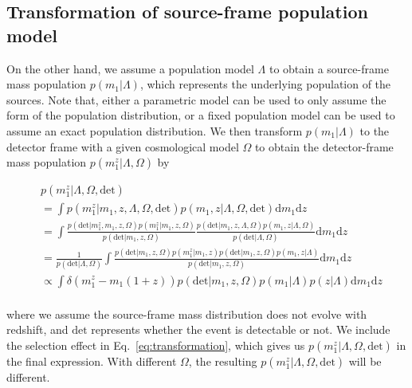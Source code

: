 \documentclass[aps,prd,twocolumn,superscriptaddress,preprintnumbers,nofootinbib,hidelinks]{revtex4-2}
\begin{document}
\subsection{Transformation of source-frame population model}
\label{sec:transformation}

On the other hand, we assume a population model $\Lambda$ to obtain a source-frame mass population $p(m_1|\Lambda)$, which represents the underlying population of the sources.
Note that, either a parametric model can be used to only assume the form of the population distribution, or a fixed population model can be used to assume an exact population distribution.
We then transform $p(m_1|\Lambda)$ to the detector frame with a given cosmological model $\Omega$ to obtain the detector-frame mass population $p(m^z_1|\Lambda, \Omega)$ by
\begin{widetext}
    \begin{equation}
        \label{eq:transformation}
        \begin{split}
            &p(m^z_1|\Lambda, \Omega, \mathrm{det}) \\
            &= \int p(m^z_1|m_1, z, \Lambda, \Omega, \mathrm{det}) p(m_1, z|\Lambda, \Omega, \mathrm{det}) \mathrm{d}m_1 \mathrm{d}z \\
            &= \int \frac{p(\mathrm{det}|m^z_1, m_1, z, \Omega)p(m^z_1|m_1, z, \Omega)}{p(\mathrm{det}|m_1, z, \Omega)} \frac{p(\mathrm{det}|m_1, z, \Lambda, \Omega)p(m_1, z|\Lambda, \Omega)}{p(\mathrm{det}|\Lambda, \Omega)} \mathrm{d}m_1 \mathrm{d}z \\
            &= \frac{1}{p(\mathrm{det}|\Lambda, \Omega)}\int \frac{p(\mathrm{det}|m_1, z, \Omega)p(m^z_1|m_1, z)p(\mathrm{det}|m_1, z, \Omega)p(m_1, z|\Lambda)}{p(\mathrm{det}|m_1, z, \Omega)}  \mathrm{d}m_1 \mathrm{d}z \\
            &\propto \int \delta(m^z_1-m_1(1+z))p(\mathrm{det}|m_1, z, \Omega)p(m_1|\Lambda)p(z|\Lambda) \mathrm{d}m_1 \mathrm{d}z \\
        \end{split}
    \end{equation}
\end{widetext}
where we assume the source-frame mass distribution does not evolve with redshift, and $\mathrm{det}$ represents whether the event is detectable or not.
We include the selection effect in Eq.~\eqref{eq:transformation}, which gives us $p(m^z_1|\Lambda, \Omega, \mathrm{det})$ in the final expression.
With different $\Omega$, the resulting $p(m^z_1|\Lambda, \Omega, \mathrm{det})$ will be different.
\end{document}
